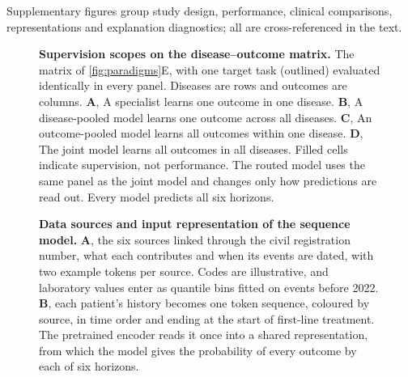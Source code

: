
\clearpage
\setcounter{figure}{0}
\renewcommand{\thefigure}{S\arabic{figure}}
\setcounter{table}{0}
\renewcommand{\thetable}{S\arabic{table}}
\renewcommand{\resultfigureheight}{0.78\textheight}


\clearpage
{}

\clearpage
{}

Supplementary figures group study design, performance, clinical comparisons,
representations and explanation diagnostics; all are cross-referenced in the text.

\begin{figure}[p]
  \centering
  \resizebox{\textwidth}{!}{}
  \caption{\textbf{Supervision scopes on the disease--outcome matrix.} The matrix of \cref{fig:paradigms}E, with one target task
  (outlined) evaluated identically in every panel. Diseases are rows and
  outcomes are columns. \textbf{A}, A specialist learns one outcome in one disease. \textbf{B}, A disease-pooled model learns one outcome across all diseases. \textbf{C}, An outcome-pooled model learns all outcomes within one disease. \textbf{D}, The joint model learns all outcomes in all diseases.
  Filled cells indicate supervision, not performance. The routed model uses
  the same panel as the joint model and changes only how predictions are read
  out. Every model predicts all six horizons.}
  \label{fig:supervision-grid}
\end{figure}

\begin{figure}[p]
\centering
\resizebox{\textwidth}{!}{}
\caption{\textbf{Data sources and input representation of the sequence model.} \textbf{A}, the six sources linked
through the civil registration number, what each contributes and when its events
are dated, with two example tokens per source. Codes are illustrative, and laboratory values enter as quantile bins fitted on events before 2022. \textbf{B}, each patient's history becomes one token sequence, coloured by source,
in time order and ending at the start of first-line treatment. The pretrained
encoder reads it once into a shared representation, from which the model gives
the probability of every outcome by each of six horizons.}
\label{fig:model-inputs}
\end{figure}

